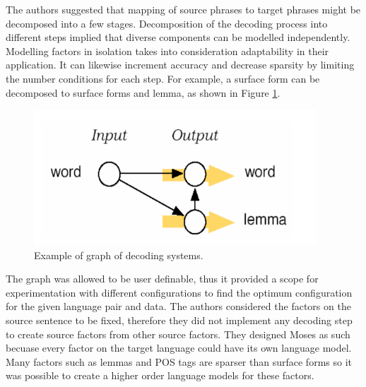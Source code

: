 The authors suggested that mapping of source phrases to target phrases might be decomposed into a few stages. Decomposition of the decoding process into different steps implied that diverse components can be modelled independently. Modelling factors in isolation takes into consideration adaptability in their application. It can likewise increment accuracy and decrease sparsity by limiting the number conditions for each step. For example, a surface form can be decomposed to surface forms and lemma, as shown in Figure \ref{exfac}.
\begin{figure}
\begin{center}
\includegraphics[width=300pt]{figures/moses3.png}
\caption{Example of graph of decoding systems. \citep{Koehn:2007:MOS:1557769.1557821}} \label{exfac}
\end{center}
\end{figure}

The graph was allowed to be user definable, thus it provided a scope for experimentation with different configurations to find the optimum configuration for the given language pair and data. The authors considered the factors on the source sentence to be fixed, therefore they did not implement any decoding step to create source factors from other source factors. They designed Moses as such becuase every factor on the target language could have its own language model.  Many factors such as lemmas and POS tags are sparser than surface forms so it was possible to create a higher order language models for these factors.

